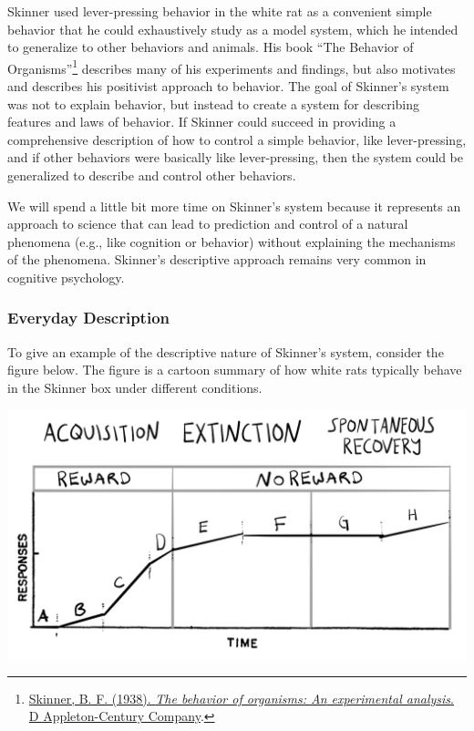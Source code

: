 \documentclass[
  oneside,
  12pt]{crumpbook}
\begin{document}
Skinner used lever-pressing behavior in the white rat as a convenient simple behavior that he could exhaustively study as a model system, which he intended to generalize to other behaviors and animals. His book ``The Behavior of Organisms''\footnote{\protect\hyperlink{ref-skinnerBehaviorOrganismsExperimental1938}{Skinner, B. F. (1938). \emph{The behavior of organisms: {An} experimental analysis}. {D Appleton-Century Company}}.} describes many of his experiments and findings, but also motivates and describes his positivist approach to behavior. The goal of Skinner's system was not to explain behavior, but instead to create a system for describing features and laws of behavior. If Skinner could succeed in providing a comprehensive description of how to control a simple behavior, like lever-pressing, and if other behaviors were basically like lever-pressing, then the system could be generalized to describe and control other behaviors.

We will spend a little bit more time on Skinner's system because it represents an approach to science that can lead to prediction and control of a natural phenomena (e.g., like cognition or behavior) without explaining the mechanisms of the phenomena. Skinner's descriptive approach remains very common in cognitive psychology.

\hypertarget{everyday-description}{%
\subsubsection{Everyday Description}\label{everyday-description}}

To give an example of the descriptive nature of Skinner's system, consider the figure below. The figure is a cartoon summary of how white rats typically behave in the Skinner box under different conditions.

\begin{center}\includegraphics[width=1\linewidth]{imgs/Skinner_description} \end{center}
\end{document}
